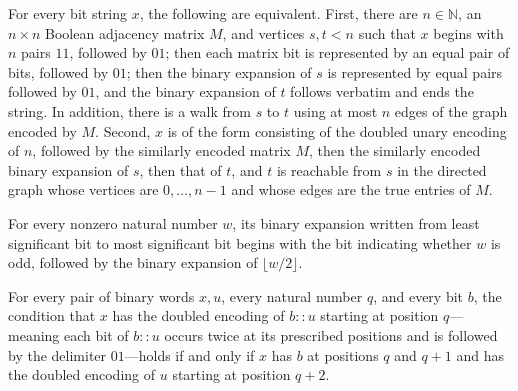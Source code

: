 \begin{theorem}
\label{Complexity.pathAcc_iff}
\leanok
{}
For every bit string $x$, the following are equivalent. First, there are $n\in\mathbb
N$, an $n\times n$ Boolean adjacency matrix $M$, and vertices $s,t<n$ such that $x$
begins with $n$ pairs $11$, followed by $01$; then each matrix bit is represented by an
equal pair of bits, followed by $01$; then the binary expansion of $s$ is represented by
equal pairs followed by $01$, and the binary expansion of $t$ follows verbatim and ends
the string. In addition, there is a walk from $s$ to $t$ using at most $n$ edges of the
graph encoded by $M$. Second, $x$ is of the form consisting of the doubled unary
encoding of $n$, followed by the similarly encoded matrix $M$, then the similarly
encoded binary expansion of $s$, then that of $t$, and $t$ is reachable from $s$ in the
directed graph whose vertices are $0,\ldots,n-1$ and whose edges are the true entries of
$M$.
\end{theorem}

\begin{lemma}
\label{Complexity.bits_eq_cons}
\leanok
{}
For every nonzero natural number $w$, its binary expansion written from least
significant bit to most significant bit begins with the bit indicating whether $w$ is
odd, followed by the binary expansion of $\lfloor w/2\rfloor$.
\end{lemma}

\begin{lemma}
\label{Complexity.dblAt_cons}
\leanok
{}
For every pair of binary words $x,u$, every natural number $q$, and every bit $b$, the
condition that $x$ has the doubled encoding of $b::u$ starting at position $q$—meaning
each bit of $b::u$ occurs twice at its prescribed positions and is followed by the
delimiter $01$—holds if and only if $x$ has $b$ at positions $q$ and $q+1$ and has the
doubled encoding of $u$ starting at position $q+2$.
\end{lemma}

